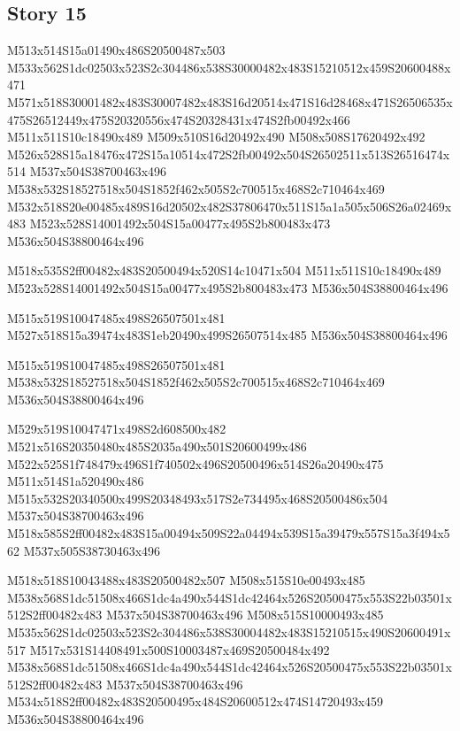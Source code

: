 \documentclass{article}
\begin{document}
\subsection{Story 15}

\begin{multicols}{5}
\begin{center}

M513x514S15a01490x486S20500487x503 %
M533x562S1dc02503x523S2c304486x538S30000482x483S15210512x459S20600488x471 %
M571x518S30001482x483S30007482x483S16d20514x471S16d28468x471S26506535x475S26512449x475S20320556x474S20328431x474S2fb00492x466 %
M511x511S10c18490x489 %
M509x510S16d20492x490 %
M508x508S17620492x492 %
M526x528S15a18476x472S15a10514x472S2fb00492x504S26502511x513S26516474x514 %
M537x504S38700463x496 %
M538x532S18527518x504S1852f462x505S2c700515x468S2c710464x469 %
M532x518S20e00485x489S16d20502x482S37806470x511S15a1a505x506S26a02469x483 %
M523x528S14001492x504S15a00477x495S2b800483x473 %
M536x504S38800464x496 %

M518x535S2ff00482x483S20500494x520S14c10471x504 %
M511x511S10c18490x489 %
M523x528S14001492x504S15a00477x495S2b800483x473 %
M536x504S38800464x496 %

M515x519S10047485x498S26507501x481 %
M527x518S15a39474x483S1eb20490x499S26507514x485 %
M536x504S38800464x496 %

M515x519S10047485x498S26507501x481 %
M538x532S18527518x504S1852f462x505S2c700515x468S2c710464x469 %
M536x504S38800464x496 %

M529x519S10047471x498S2d608500x482 %
M521x516S20350480x485S2035a490x501S20600499x486 %
M522x525S1f748479x496S1f740502x496S20500496x514S26a20490x475 %
M511x514S1a520490x486 %
M515x532S20340500x499S20348493x517S2e734495x468S20500486x504 %
M537x504S38700463x496 %
M518x585S2ff00482x483S15a00494x509S22a04494x539S15a39479x557S15a3f494x562 %
M537x505S38730463x496 %

M518x518S10043488x483S20500482x507 %
M508x515S10e00493x485 %
M538x568S1dc51508x466S1dc4a490x544S1dc42464x526S20500475x553S22b03501x512S2ff00482x483 %
M537x504S38700463x496 %
M508x515S10000493x485 %
M535x562S1dc02503x523S2c304486x538S30004482x483S15210515x490S20600491x517 %
M517x531S14408491x500S10003487x469S20500484x492 %
M538x568S1dc51508x466S1dc4a490x544S1dc42464x526S20500475x553S22b03501x512S2ff00482x483 %
M537x504S38700463x496 %
M534x518S2ff00482x483S20500495x484S20600512x474S14720493x459 %
M536x504S38800464x496 %


\end{center}
\end{multicols}
\end{document}
